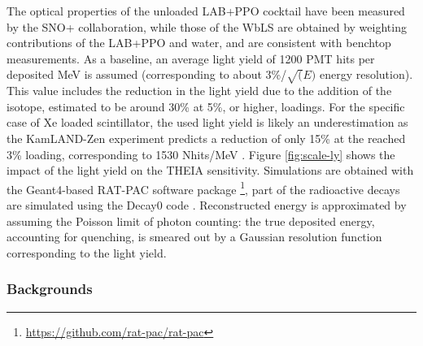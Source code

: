The optical properties of the unloaded LAB+PPO cocktail have been measured by the SNO+ collaboration, while those of the WbLS are obtained by weighting contributions of the LAB+PPO and water, and are consistent with benchtop measurements. As a baseline, an average light yield of 1200 PMT hits per deposited MeV is assumed (corresponding to about 3\%/$\sqrt(E)$ energy resolution). This value includes the reduction in the light yield due to the addition of the isotope, estimated to be around 30\% at 5\%, or higher, loadings. For the specific case of Xe loaded scintillator, the used light yield is likely an underestimation as the KamLAND-Zen experiment predicts a reduction of only 15\% at the reached 3\% loading, corresponding to 1530 Nhits/MeV \cite{KZ-2011}. Figure \ref{fig:scale-ly} shows the impact of the light yield on the THEIA sensitivity.
Simulations are obtained with the Geant4-based RAT-PAC software package \footnote{\url{https://github.com/rat-pac/rat-pac}}, part of the radioactive decays are simulated using the Decay0 code \cite{decay0}. Reconstructed energy is approximated by assuming the Poisson limit of
photon counting: the true deposited energy, accounting for quenching, is smeared out by a Gaussian resolution function corresponding to the light
yield.

\subsubsection{Backgrounds}

